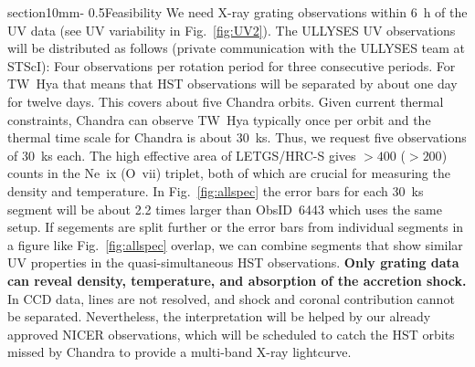 \documentclass[letterpaper,11pt,twocolumn]{article}
\makeatletter
\renewcommand{\section}{\@startsection%
{section}{1}{0mm}{-\baselineskip}%
{0.5\baselineskip}{\normalfont\Large\bfseries}}%
\makeatother
\begin{document}
\section{Feasibility}
We need X-ray grating observations within 6~h of the UV data (see UV
variability in Fig.~\ref{fig:UV2}). The ULLYSES UV observations will
be distributed as follows (private communication with the ULLYSES team
at STScI): Four observations per rotation period for three consecutive
periods. For TW~Hya that means that HST observations will be separated
by about one day for twelve days. This covers about five Chandra
orbits. Given current thermal constraints, Chandra can observe TW~Hya
typically once per orbit and the thermal time scale for Chandra is
about 30~ks. Thus, we request five observations of 30~ks each. The
high effective area of LETGS/HRC-S gives $> 400$ ($>200$) counts in
the Ne~{\sc ix} (O~{\sc vii}) triplet, both of which are crucial for
measuring the density and temperature.  In Fig.~\ref{fig:allspec} the
error bars for each 30~ks segment will be about 2.2 times larger than
ObsID~6443 which uses the same setup. If segements are split further
or the error bars from individual segments in a figure like
Fig.~\ref{fig:allspec} overlap, we can combine segments that show
similar UV properties in the quasi-simultaneous HST observations.
\textbf{Only grating data can reveal density, temperature, and
  absorption of the accretion shock.}  In CCD data, lines are not
resolved, and shock and coronal contribution cannot be
separated. Nevertheless, the interpretation will be helped by our
already approved NICER observations, which will be scheduled to catch
the HST orbits missed by Chandra to provide a multi-band X-ray
lightcurve.
 







%
\end{document}
